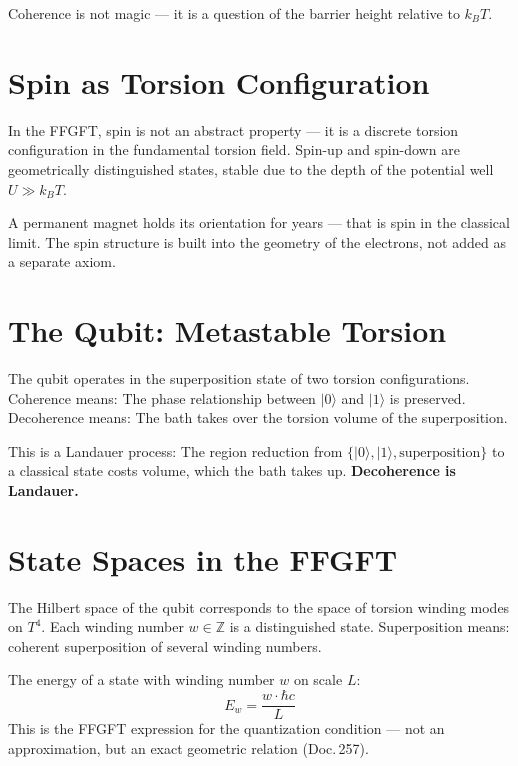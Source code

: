 \label{ch:qubit}

\epigraph{Coherence is not magic --- it is a question of the
barrier height relative to $k_BT$.}{}

\section{Spin as Torsion Configuration}

In the FFGFT, spin is not an abstract property --- it is a discrete
torsion configuration in the fundamental torsion field. Spin-up and spin-down
are geometrically distinguished states, stable due to the depth of the
potential well $U \gg k_BT$. 

\begin{laierspur}
A permanent magnet holds its orientation for years --- that is spin
in the classical limit. The spin structure is built into the geometry of the electrons,
not added as a separate axiom.
\end{laierspur}

\section{The Qubit: Metastable Torsion}

The qubit operates in the superposition state of two torsion configurations.
Coherence means: The phase relationship between $|0\rangle$ and $|1\rangle$
is preserved. Decoherence means: The bath takes over the torsion volume
of the superposition. 

This is a Landauer process: The region reduction from $\{|0\rangle,
|1\rangle, \text{superposition}\}$ to a classical state costs
volume, which the bath takes up. \textbf{Decoherence is Landauer.} 

\section{State Spaces in the FFGFT}

The Hilbert space of the qubit corresponds to the space of torsion winding modes
on $T^4$. Each winding number $w \in \mathbb{Z}$ is a distinguished
state. Superposition means: coherent superposition of several
winding numbers.

The energy of a state with winding number $w$ on scale $L$:
\[
  E_w = \frac{w \cdot \hbar c}{L}
\]
This is the FFGFT expression for the quantization condition --- not an
approximation, but an exact geometric relation (Doc.\,257). 